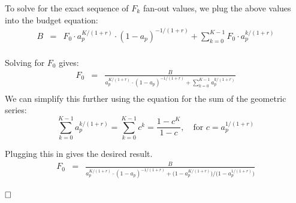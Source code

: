 To solve for the exact sequence of $F_k$ fan-out values, we plug the above values into the budget equation:
\begin{eqnarray*}
    B &=& F_0 \cdot a_p^{K/(1 + r)} \cdot (1-a_p)^{-1/(1 + r)}  + \sum_{k=0}^{K-1} F_0 \cdot a_p^{k/(1 + r)} \\
\end{eqnarray*}

Solving for $F_0$ gives:
\begin{eqnarray*}
    F_0 &=& \frac{B}{ a_p^{K/(1 + r)} \cdot (1-a_p)^{-1/(1 + r)} + \sum_{k=0}^{K-1} a_p^{k/(1 + r)}} \\
\end{eqnarray*}
We can simplify this further using the equation for the sum of the geometric series:
$$\sum_{k=0}^{K-1} a_p^{k/(1 + r)} = \sum_{k=0}^{K-1} c^k = \frac{1-c^K}{1-c}, \quad \text{for } c = a_p^{1/(1 + r)}$$

Plugging this in gives the desired result.
\begin{eqnarray*}
    F_0 &=& \frac{B}{a_p^{K/(1 + r)} \cdot (1-a_p)^{-1/(1 + r)} +  \Big(1-a_p^{K/(1 + r)}\Big)/\Big( 1-a_p^{1/(1 + r)}\Big)} 
\end{eqnarray*}

$\hfill\square$